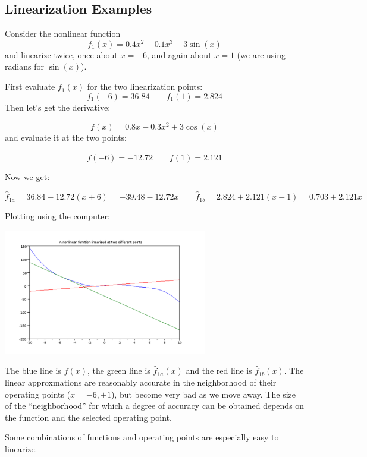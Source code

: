 \subsection{Linearization Examples}
\begin{ExampleSmall}\label{twolinexamples}

Consider the nonlinear function
\[
f_1(x) = 0.4x^2 -0.1x^3 + 3\sin(x)
\]
and linearize twice, once about $x=-6$, and again about $x=1$ (we are using radians for $\sin(x)$).

\vspace{0.2in}

First evaluate $f_1(x)$ for the two linearization points:
\[
f_1(-6) = 36.84 \qquad  f_1(1) = 2.824
\]
Then let's get the derivative:

\[
\dot{f}(x) = 0.8x -0.3x^2 +3\cos(x)
\]
and evaluate it at the two points:

\[
\dot{f}(-6) = -12.72 \qquad \dot{f}(1) = 2.121
\]

Now we get:

\[
\hat{f}_{1a} = 36.84-12.72(x+6) = -39.48-12.72x \qquad \hat{f}_{1b} = 2.824+2.121(x-1) = 0.703+2.121x
\]

Plotting using the computer:
\begin{center}
\includegraphics[width=3.5in]{figs01/linearizeattwopointsa.png}
\end{center}

The blue line is $f(x)$, the green line is $\hat{f}_{1a}(x)$ and the red line is $\hat{f}_{1b}(x)$.  The linear approxmations are reasonably accurate in the neighborhood of their operating points ($x = -6, +1$), but become very bad as we move away.  The size of the ``neighborhood'' for which a degree of accuracy can be obtained depends on the function and the selected operating point.

\end{ExampleSmall}


Some combinations of functions and operating points are especially easy to linearize.

